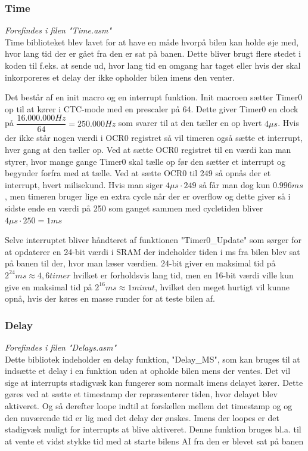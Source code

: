 \subsubsection{Time}
\textit{Forefindes i filen "Time.asm"}\\
Time biblioteket blev lavet for at have en måde hvorpå bilen kan holde øje med, hvor lang tid der er gået fra den er sat på banen. Dette bliver brugt flere stedet i koden til f.eks. at sende ud, hvor lang tid en omgang har taget eller hvis der skal inkorporeres et delay der ikke opholder bilen imens den venter. 

Det består af en init macro og en interrupt funktion. Init macroen sætter Timer0 op til at kører i CTC-mode med en prescaler på 64. Dette giver Timer0 en clock på $\dfrac{16.000.000Hz}{64} = 250.000Hz$ som svarer til at den tæller en op hvert $4\mu s$. Hvis der ikke står nogen værdi i OCR0 registret så vil timeren også sætte et interrupt, hver gang at den tæller op. Ved at sætte OCR0 registret til en værdi kan man styrer, hvor mange gange Timer0 skal tælle op før den sætter et interrupt og begynder forfra med at tælle. Ved at sætte OCR0 til 249 så opnås der et interrupt, hvert milisekund. Hvis man siger $4\mu s  \cdot 249$ så får man dog kun $0.996 ms$, men timeren bruger lige en extra cycle når der er overflow og dette giver så i sidste ende en værdi på 250 som ganget sammen med cycletiden bliver $4\mu s  \cdot 250 = 1ms$ \par
Selve interruptet bliver håndteret af funktionen "Timer0\_Update" som sørger for at opdaterer en 24-bit værdi i SRAM der indeholder tiden i ms fra bilen blev sat på banen til der, hvor man læser værdien. 24-bit giver en maksimal tid på $2^{24} ms \approx 4,6 timer$ hvilket er forholdsvis lang tid, men en 16-bit værdi ville kun give en maksimal tid på $2^{16}ms \approx 1 minut$, hvilket den meget hurtigt vil kunne opnå, hvis der køres en masse runder for at teste bilen af.

\subsubsection{Delay}
\textit{Forefindes i filen "Delays.asm"}\\
Dette bibliotek indeholder en delay funktion, "Delay\_MS", som kan bruges til at indsætte et delay i en funktion uden at opholde bilen mens der ventes. Det vil sige at interrupts stadigvæk kan fungerer som normalt imens delayet kører. Dette gøres ved at sætte et timestamp der repræsenterer tiden, hvor delayet blev aktiveret. Og så derefter loope indtil at forskellen mellem det timestamp og og den nuværende tid er lig med det delay der ønskes. Imens der loopes er det stadigvæk muligt for interrupts at blive aktiveret. Denne funktion bruges bl.a. til at vente et vidst stykke tid med at starte bilens AI fra den er blevet sat på banen

